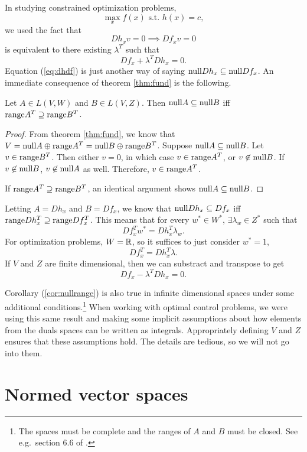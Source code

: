 In studying constrained optimization  problems, 
\[ \max_x f(x) \text{ s.t.  } h(x) = c, \]
we used the fact that
\begin{equation}
  D h_x v = 0 \implies D f_x v = 0 \label{eq:dhdf}
\end{equation}
is equivalent to there existing $\lambda^T$ such that
\[ Df_x + \lambda^T Dh_x = 0. \]
Equation (\ref{eq:dhdf}) is just another way of saying $\mathrm{null} Dh_x
\subseteq \mathrm{null} Df_x$. An immediate consequence of theorem
\ref{thm:fund} is the following. 
\begin{corollary}\label{cor:nullrange}
  Let $A \in L(V,W)$ and $B \in L(V,Z)$. Then $\mathrm{null} A \subseteq
  \mathrm{null} B$ iff $\mathrm{range} A^T \supseteq \mathrm{range} B^T$.
\end{corollary}
\begin{proof}
  From theorem \ref{thm:fund}, we know that $V = \mathrm{null} A \oplus
  \mathrm{range} A^T = \mathrm{null} B \oplus \mathrm{range} B^T$. Suppose $\mathrm{null} A
  \subseteq \mathrm{null} B$. Let $v \in \mathrm{range} B^T$. Then either $v =
  0$, in which case $v \in \mathrm{range} A^T$, or $v \not\in \mathrm{null} B$. If $v
  \not\in \mathrm{null} B$, $v \not\in \mathrm{null} A$ as well. Therefore, $v \in \mathrm{range}
  A^T$. 

  If $\mathrm{range} A^T \supseteq \mathrm{range} B^T$, an identical argument shows
  $\mathrm{null} A \subseteq \mathrm{null} B$.
\end{proof}
Letting $A = Dh_x$ and $B=Df_x$, we know that $\mathrm{null} Dh_x \subseteq
Df_x$ iff $\mathrm{range} Dh_x^T \supseteq \mathrm{range} Df_x^T$. This means that for
every $w^* \in W^*$, $\exists \lambda_w \in Z^*$ such that
\[ Df_x^T w^* = Dh_x^T \lambda_w. \]
For optimization problems, $W=\mathbb{R}$, so it suffices to just consider
$w^* = 1$, 
\[ Df_x^T = Dh_x^T \lambda. \]
 If $V$ and $Z$ are finite dimensional, then we can substract and
 transpose to get
\[ Df_x - \lambda^T Dh_x = 0. \]

Corollary (\ref{cor:nullrange}) is also true in infinite dimensional
spaces under some additional conditions.\footnote{The spaces must be complete
and the ranges of $A$ and $B$ must be closed. See e.g.\ section 6.6 of
\cite{luenberger1969}.}
When working with optimal control problems, we were using this same
result and making some implicit assumptions about how elements from
the duals spaces can be written as integrals. Appropriately defining
$V$ and $Z$ ensures that these assumptions hold. The details are
tedious, so we will not go into them. 

\section{Normed vector spaces}

